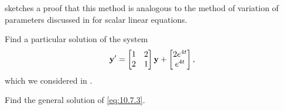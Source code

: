  sketches a proof that this method is analogous
to the method of variation of parameters discussed in
 for scalar linear
equations.

\begin{example}\label{example:10.7.1}
\begin{alist}
\item %
Find a particular solution of the system
\begin{equation} \label{eq:10.7.3}
\mathbf{y}'=\begin{bmatrix}1&2\\2&1\end{bmatrix}\mathbf{y}+\begin{bmatrix}2e^{4t}\\e^{4t}\end{bmatrix},
\end{equation}
which we considered in .
\item %
Find the general solution of  \eqref{eq:10.7.3}.
\end{alist}
\end{example}

